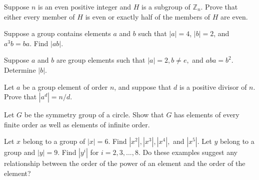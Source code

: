 \documentclass[11pt,largemargins]{homework}
\begin{document}
\question
Suppose $n$ is an even positive integer and $H$ is a subgroup of $\mathbb{Z}_n$. Prove that either every member of $H$ is 
even or exactly half of the members of $H$ are even.

\question
Suppose a group contains elements $a$ and $b$ such that $|a|=4$, $|b|=2$, and $a^3b=ba$. Find $|ab|$.

\question
Suppose $a$ and $b$ are group elements such that $|a|=2, b\neq e,$ and $aba=b^2$. Determine $|b|$.

\question
Let $a$ be a group element of order $n$, and suppose that $d$ is a positive divisor of $n$. Prove that $|a^d|=n/d$.

\question

\question

\question

\question
Let $G$ be the symmetry group of a circle. Show that $G$ has elements of every finite order as well as 
elements of infinite order.

\question
Let $x$ belong to a group of $|x|=6$. Find $|x^2|,|x^3|,|x^4|,$ and $|x^5|$. Let $y$ belong to a group 
and $|y|=9$. Find $|y^i|$ for $i=2,3,...,8$. Do these examples suggest any relationship between the order of the power 
of an element and the order of the element?

\question

\question

\question

\question

\question

\question

\question

\question

\question

\question

\question

\question

\question

\question

\question

\question

\question

\question

\question

\question

\question

\question
\end{document}
